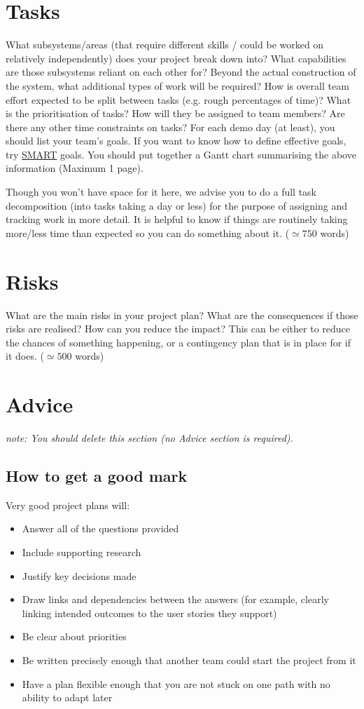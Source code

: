 \documentclass{article}
\begin{document}
\section{Tasks}
What subsystems/areas (that require different skills / could be worked on relatively independently) does your project break down into? What capabilities are those subsystems reliant on each other for? Beyond the actual construction of the system, what additional types of work will be required?
How is overall team effort expected to be split between tasks (e.g. rough percentages of time)? What is the prioritisation of tasks? How will they be assigned to team members? Are there any other time constraints on tasks?
For each demo day (at least), you should list your team’s goals. If you want to know how to define effective goals, try \href{https://www.mindtools.com/pages/article/smart-goals.htm}{SMART} goals.
You should put together a Gantt chart summarising the above information (Maximum 1 page).

Though you won’t have space for it here, we advise you to do a full task decomposition (into tasks taking a day or less) for the purpose of assigning and tracking work in more detail. It is helpful to know if things are routinely taking more/less time than expected so you can do something about it.
 ($\simeq 750$ words)

\section{Risks}
What are the main risks in your project plan? What are the consequences if those risks are realised? How can you reduce the impact? This can be either to reduce the chances of something happening, or a contingency plan that is in place for if it does.
 ($\simeq 500$ words)

\section*{Advice}
\textit{note: You should delete this section (no Advice section is required).}

\subsection*{How to get a good mark}

Very good project plans will:
\begin{itemize}
    \item Answer all of the questions provided
    \item Include supporting research
    \item Justify key decisions made
    \item Draw links and dependencies between the answers (for example, clearly linking intended outcomes to the user stories they support)
    \item Be clear about priorities
    \item 	Be written precisely enough that another team could start the project from it
    \item Have a plan flexible enough that you are not stuck on one path with no ability to adapt later
\end{itemize}
\end{document}
